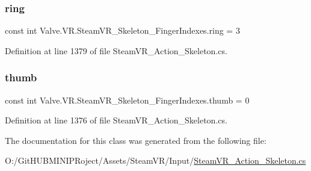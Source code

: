 \subsubsection{\texorpdfstring{ring}{ring}}
{\footnotesize\ttfamily const int Valve.\+V\+R.\+Steam\+V\+R\+\_\+\+Skeleton\+\_\+\+Finger\+Indexes.\+ring = 3}



Definition at line 1379 of file Steam\+V\+R\+\_\+\+Action\+\_\+\+Skeleton.\+cs.

\mbox{\label{class_valve_1_1_v_r_1_1_steam_v_r___skeleton___finger_indexes_a18e68324ea9a2433032b0fe8b3900790}} 
\subsubsection{\texorpdfstring{thumb}{thumb}}
{\footnotesize\ttfamily const int Valve.\+V\+R.\+Steam\+V\+R\+\_\+\+Skeleton\+\_\+\+Finger\+Indexes.\+thumb = 0}



Definition at line 1376 of file Steam\+V\+R\+\_\+\+Action\+\_\+\+Skeleton.\+cs.



The documentation for this class was generated from the following file\+:\begin{DoxyCompactItemize}
\item 
O\+:/\+Git\+H\+U\+B\+M\+I\+N\+I\+P\+Roject/\+Assets/\+Steam\+V\+R/\+Input/\mbox{\hyperlink{_steam_v_r___action___skeleton_8cs}{Steam\+V\+R\+\_\+\+Action\+\_\+\+Skeleton.\+cs}}\end{DoxyCompactItemize}
